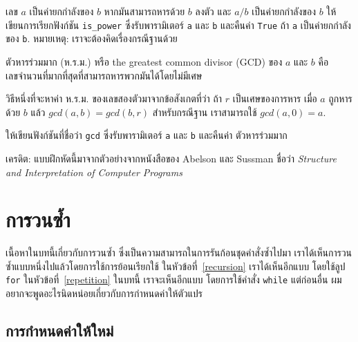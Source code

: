\begin{exercise}

เลข {\scriptsize$a$} เป็นค่ายกกำลังของ {\scriptsize$b$} 
หากมันสามารถหารด้วย {\scriptsize$b$} ลงตัว และ {\scriptsize$a/b$} เป็นค่ายกกำลังของ {\scriptsize$b$}
ให้เขียนการเรียกฟังก์ชัน \verb"is_power" ซึ่งรับพารามิเตอร์ {\tt a} และ {\tt b}
และคืนค่า {\tt True} ถ้า {\tt a} เป็นค่ายกกำลังของ {\tt b}. 
หมายเหตุ: เราจะต้องคิดเรื่องกรณีฐานด้วย

\end{exercise}


\begin{exercise}

ตัวหารร่วมมาก (ห.ร.ม.) หรือ the greatest common divisor (GCD) ของ {\scriptsize$a$} และ {\scriptsize$b$}
คือเลขจำนวนที่มากที่สุดที่สามารถหารพวกมันได้โดยไม่มีเศษ 

วิธีหนึ่งที่จะหาค่า ห.ร.ม. ของเลขสองตัวมาจากข้อสังเกตที่ว่า ถ้า {\scriptsize$r$} เป็นเศษของการหาร
เมื่อ {\scriptsize$a$} ถูกหารด้วย {\scriptsize$b$} แล้ว {\scriptsize$gcd(a, b) = gcd(b, r)$}
สำหรับกรณีฐาน เราสามารถใช้ {\scriptsize$gcd(a, 0) = a$}.

ให้เขียนฟังก์ชันที่ชื่อว่า \verb"gcd" ซึ่งรับพารามิเตอร์ {\tt a} และ {\tt b} และคืนค่า
ตัวหารร่วมมาก

เครดิต: แบบฝึกหัดนี้มาจากตัวอย่างจากหนังสือของ Abelson และ Sussman ชื่อว่า 
{\em Structure and Interpretation of Computer Programs}

\end{exercise}



\chapter{การวนซ้ำ} %

เนื้อหาในบทนี้เกี่ยวกับการวนซ้ำ ซึ่งเป็นความสามารถในการรันก้อนชุดคำสั่งซ้ำไปมา 
เราได้เห็นการวนซ้ำแบบหนึ่งไปแล้วโดยการใช้การย้อนเรียกใช้ ในหัวข้อที่~\ref{recursion} เราได้เห็นอีกแบบ
โดยใช้ลูป {\tt for} ในหัวข้อที่~\ref{repetition} ในบทนี้ เราจะเห็นอีกแบบ
โดยการใช้คำสั่ง {\tt while}
แต่ก่อนอื่น ผมอยากจะพูดอะไรนิดหน่อยเกี่ยวกับการกำหนดค่าให้ตัวแปร

\section{การกำหนดค่าให้ใหม่ } %

